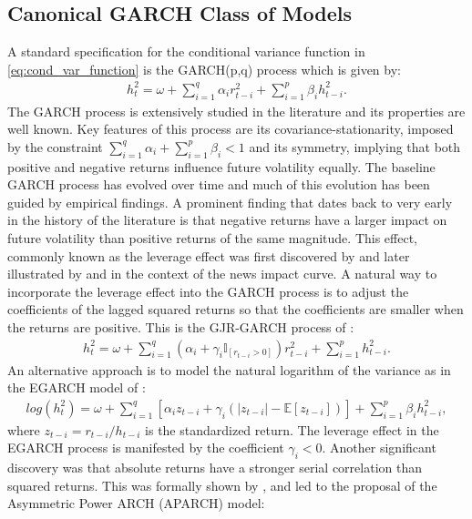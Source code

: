 \documentclass{article} %
\begin{document}
	\subsection{Canonical GARCH Class of Models}
	A standard specification for the conditional variance function in \eqref{eq:cond_var_function} is the GARCH(p,q) process which is given by:
	\begin{align}
		h_t^2 = \omega + \sum_{i=1}^q \alpha_i r_{t-i}^2 + \sum_{i=1}^p \beta_i h_{t-i}^2.
	\end{align}
	The GARCH process is extensively studied in the literature and its properties are well known. Key features of this process are its covariance-stationarity, imposed by the constraint $\sum_{i=1}^q\alpha_i+\sum_{i=1}^p\beta_i<1$  and its symmetry, implying that both positive and negative returns influence future volatility equally. The baseline GARCH process has evolved over time and much of this evolution has been guided by empirical findings. A prominent finding that dates back to very early in the history of the literature is that negative returns have a larger impact on future volatility than positive returns of the same magnitude. This effect, commonly known as the leverage effect was first discovered by \textcite{Black1976} and later illustrated by \textcite{PAGAN1990267} and \textcite{ENGLE_NG1993} in the context of the news impact curve. A natural way to incorporate the leverage effect into the GARCH process is to adjust the coefficients of the lagged squared returns so that the coefficients are smaller when the returns are positive. This is the GJR-GARCH process of \textcite{GLOSTEN1993}:
	\begin{align}
		h_t^2 = \omega + \sum_{i=1}^q \left( \alpha_i + \gamma_i \mathbb{I}_{{[r_{t-i}>0]}} \right) r_{t-i}^2 + \sum_{i=1}^p h_{t-i}^2.
	\end{align}
	An alternative approach is to model the natural logarithm of the variance as in the EGARCH model of \textcite{NELSON1991}:
	\begin{align}
		log (h_t^2) = \omega + \sum_{i=1}^q \left[ \alpha_i z_{t-i} + \gamma_i \left( |z_{t-i}| - \mathbb{E}\left[ z_{t-i} \right] \right) \right] + \sum_{i=1}^p \beta_i h_{t-i}^2,
	\end{align}
	where $z_{t-i} = r_{t-i}/h_{t-i}$ is the standardized return. The leverage effect in the EGARCH process is manifested by the coefficient $\gamma_i < 0$. Another significant discovery was that absolute returns have a stronger serial correlation than squared returns. This was formally shown by \textcite{DING199383}, and led to the proposal of the Asymmetric Power ARCH (APARCH) model:
\end{document}
